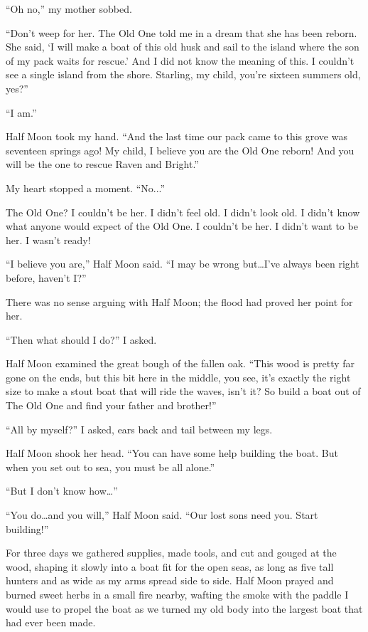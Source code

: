 ``Oh no,'' my mother sobbed.

``Don't weep for her. The Old One told me in a dream that she has been reborn. She said, `I will make a boat of this old husk and sail to the island where the son of my pack waits for rescue.' And I did not know the meaning of this. I couldn't see a single island from the shore. Starling, my child, you're sixteen summers old, yes?''

``I am.''

Half Moon took my hand. ``And the last time our pack came to this grove was seventeen springs ago! My child, I believe you are the Old One reborn! And you will be the one to rescue Raven and Bright.''

My heart stopped a moment. ``No...''

The Old One? I couldn't be her. I didn't feel old. I didn't look old. I didn't know what anyone would expect of the Old One. I couldn't be her. I didn't want to be her. I wasn't ready!

``I believe you are,'' Half Moon said. ``I may be wrong but\ldots{}I've always been right before, haven't I?''

There was no sense arguing with Half Moon; the flood had proved her point for her.

``Then what should I do?'' I asked.

Half Moon examined the great bough of the fallen oak. ``This wood is pretty far gone on the ends, but this bit here in the middle, you see, it's exactly the right size to make a stout boat that will ride the waves, isn't it? So build a boat out of The Old One and find your father and brother!''

``All by myself?'' I asked, ears back and tail between my legs.

Half Moon shook her head. ``You can have some help building the boat. But when you set out to sea, you must be all alone.''

``But I don't know how\ldots''

``You do\ldots{}and you will,'' Half Moon said. ``Our lost sons need you. Start building!''

\secdiv

\noindent For three days we gathered supplies, made tools, and cut and gouged at the wood, shaping it slowly into a boat fit for the open seas, as long as five tall hunters and as wide as my arms spread side to side. Half Moon prayed and burned sweet herbs in a small fire nearby, wafting the smoke with the paddle I would use to propel the boat as we turned my old body into the largest boat that had ever been made.

